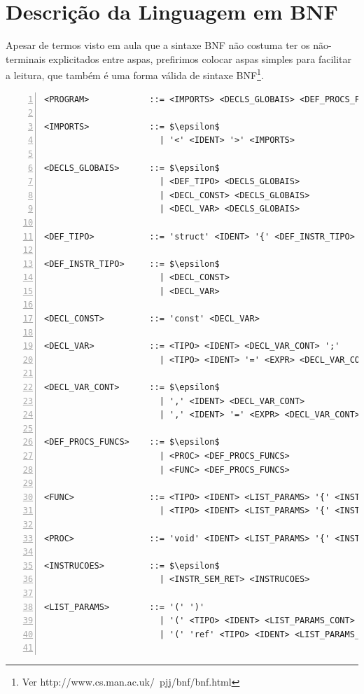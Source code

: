 \section{Descrição da Linguagem em BNF}
\label{sec:bnf}

Apesar de termos visto em aula que a sintaxe BNF não costuma ter os não-terminais explicitados entre aspas, prefirimos colocar aspas simples para facilitar a leitura, que também é uma forma válida de sintaxe BNF\footnote{Ver http://www.cs.man.ac.uk/~pjj/bnf/bnf.html}.

\begin{lstlisting}[frame=single,numbers=left,breaklines=true,mathescape=true>,basicstyle=\ttfamily\scriptsize]
<PROGRAM>            ::= <IMPORTS> <DECLS_GLOBAIS> <DEF_PROCS_FUNCS> <DEF_MAIN>

<IMPORTS>            ::= $\epsilon$
                       | '<' <IDENT> '>' <IMPORTS>

<DECLS_GLOBAIS>      ::= $\epsilon$
                       | <DEF_TIPO> <DECLS_GLOBAIS>
                       | <DECL_CONST> <DECLS_GLOBAIS>
                       | <DECL_VAR> <DECLS_GLOBAIS>  

<DEF_TIPO>           ::= 'struct' <IDENT> '{' <DEF_INSTR_TIPO> '}'

<DEF_INSTR_TIPO>     ::= $\epsilon$
                       | <DECL_CONST>
                       | <DECL_VAR>

<DECL_CONST>         ::= 'const' <DECL_VAR>

<DECL_VAR>           ::= <TIPO> <IDENT> <DECL_VAR_CONT> ';'
                       | <TIPO> <IDENT> '=' <EXPR> <DECL_VAR_CONT> ';'

<DECL_VAR_CONT>      ::= $\epsilon$
                       | ',' <IDENT> <DECL_VAR_CONT>
                       | ',' <IDENT> '=' <EXPR> <DECL_VAR_CONT>

<DEF_PROCS_FUNCS>    ::= $\epsilon$
                       | <PROC> <DEF_PROCS_FUNCS>
                       | <FUNC> <DEF_PROCS_FUNCS>

<FUNC>               ::= <TIPO> <IDENT> <LIST_PARAMS> '{' <INSTRUCOES> 'return' <EXPR> '}'
                       | <TIPO> <IDENT> <LIST_PARAMS> '{' <INSTRUCOES> 'return' <EXPR> ';' '}'

<PROC>               ::= 'void' <IDENT> <LIST_PARAMS> '{' <INSTRUCOES> '}'

<INSTRUCOES>         ::= $\epsilon$
                       | <INSTR_SEM_RET> <INSTRUCOES>

<LIST_PARAMS>        ::= '(' ')'
                       | '(' <TIPO> <IDENT> <LIST_PARAMS_CONT> ')'
                       | '(' 'ref' <TIPO> <IDENT> <LIST_PARAMS_CONT> ')'


\end{lstlisting}
